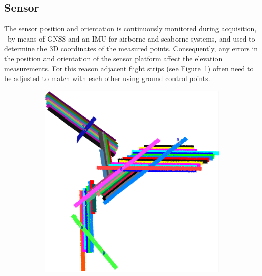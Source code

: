 \subsection{Sensor}
The sensor position and orientation is continuously monitored during acquisition, \eg\  by means of GNSS and an IMU for airborne and seaborne systems, and used to determine the 3D coordinates of the measured points. 
Consequently, any errors in the position and orientation of the sensor platform affect the elevation measurements. 
For this reason adjacent flight strips (see Figure~\ref{fig:lidarStrips}) often need to be adjusted to match with each other using ground control points. 
\begin{figure}
	\centering
	\begin{subfigure}{0.4\linewidth}
		\includegraphics[width=\textwidth]{figs/lidar_strips.png}
		\label{fig:lidarStrips}
	\end{subfigure}
	\quad
	\begin{subfigure}{0.4\linewidth}

\end{subfigure}
\end{figure}
